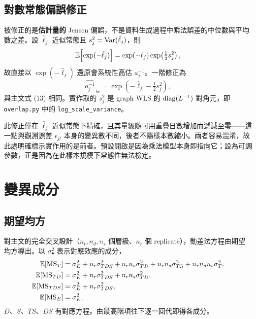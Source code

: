 \documentclass[12pt,a4paper,oneside]{article}
\begin{document}
\subsection{對數常態偏誤修正}

被修正的是\textbf{估計量的} Jensen 偏誤，不是資料生成過程中乘法誤差的中位數與平均數之差。設 $\hat{\ell}_j$ 近似常態且 $s_j^2=\operatorname{Var}(\hat{\ell}_j)$，則
\begin{equation}
\mathbb{E}\!\left[\exp(-\hat{\ell}_j)\right]
=\exp(-\ell_j)\exp\!\left(\tfrac{1}{2}s_j^2\right),
\end{equation}
故直接以 $\exp(-\hat{\ell}_j)$ 還原會系統性高估 $a_j^{-1}$。一階修正為
\begin{equation}
\widehat{a_j^{-1}}_{\,bc}=\exp\!\left(-\hat{\ell}_j-\tfrac{1}{2}s_j^2\right),
\end{equation}
與主文式 (13) 相同。實作取的 $s_j^2$ 是 graph WLS 的 $\operatorname{diag}(L^{-1})$ 對角元，即 \texttt{overlap.py} 中的 \texttt{log\_scale\_variance}。

\begin{remark}[差異之二]
此修正僅在 $\hat{\ell}_j$ 近似常態下精確，且其量級隨可用重疊日數增加而遞減至零——這一點與觀測誤差 $\epsilon_{jt}$ 本身的變異數不同，後者不隨樣本數縮小。兩者容易混淆，故此處明確標示實作用的是前者。預設開啟是因為乘法模型本身即指向它；設為可調參數，正是因為在此樣本規模下常態性無法檢定。
\end{remark}

\section{變異成分}

\subsection{期望均方}

對主文的完全交叉設計（$n_t,n_d,n_s$ 個層級、$n_r$ 個 replicate），動差法方程由期望均方導出。以 $\sigma^2_{\bullet}$ 表示對應效應的成分，
\begin{align}
\mathbb{E}[\mathrm{MS}_T] &= \sigma^2_E + n_r\sigma^2_{TDS} + n_rn_s\sigma^2_{TD}
+ n_rn_d\sigma^2_{TS} + n_rn_dn_s\sigma^2_T,\\
\mathbb{E}[\mathrm{MS}_{TD}] &= \sigma^2_E + n_r\sigma^2_{TDS} + n_rn_s\sigma^2_{TD},\\
\mathbb{E}[\mathrm{MS}_{TDS}] &= \sigma^2_E + n_r\sigma^2_{TDS},\\
\mathbb{E}[\mathrm{MS}_E] &= \sigma^2_E,
\end{align}
$D$、$S$、$TS$、$DS$ 有對應方程。由最高階項往下逐一回代即得各成分。
\end{document}
